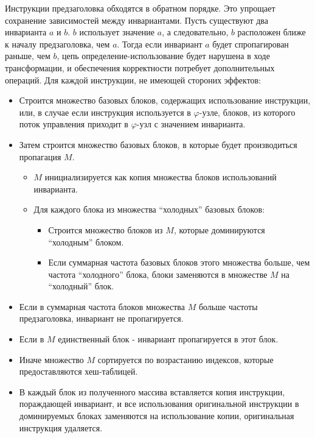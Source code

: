 Инструкции предзаголовка обходятся в обратном порядке.
Это упрощает сохранение зависимостей между инвариантами.
Пусть существуют два инварианта $a$ и $b$.
$b$ использует значение $a$, а следовательно, $b$ расположен ближе к началу предзаголовка, чем $a$.
Тогда если инвариант $a$ будет спропагирован раньше, чем $b$, цепь определение-использование будет нарушена в ходе трансформации, и обеспечения корректности потребует дополнительных операций.
Для каждой инструкции, не имеющей стороних эффектов:
\begin{itemize}
    \item Строится множество базовых блоков, содержащих использование инструкции, или, в случае если инструкция используется в $\varphi$-узле, блоков, из которого поток управления приходит в $\varphi$-узл с значением инварианта.
    \item Затем строится множество базовых блоков, в которые будет производиться пропагация $M$.
        \begin{itemize}
            \item $M$ инициализируется как копия множества блоков использований инварианта.
            \item Для каждого блока из множества \enquote{холодных} базовых блоков:
                \begin{itemize}
                    \item Строится множество блоков из $M$, которые доминируются \enquote{холодным} блоком.
                    \item Если суммарная частота базовых блоков этого множества больше, чем частота \enquote{холодного} блока, блоки заменяются в множестве $M$ на \enquote{холодный} блок.
                \end{itemize}
        \end{itemize}
    \item Если в суммарная частота блоков множества $M$ больше частоты предзаголовка, инвариант не пропагируется.
    \item Если в $M$ единственный блок - инвариант пропагируется в этот блок.
    \item Иначе множество $M$ сортируется по возрастанию индексов, которые предоставляются хеш-таблицей.
    \item В каждый блок из полученного массива вставляется копия инструкции, пораждающей инвариант, и все использования оригинальной инструкции в доминируемых блоках заменяются на использование копии, оригинальная инструкция удаляется.
\end{itemize}

